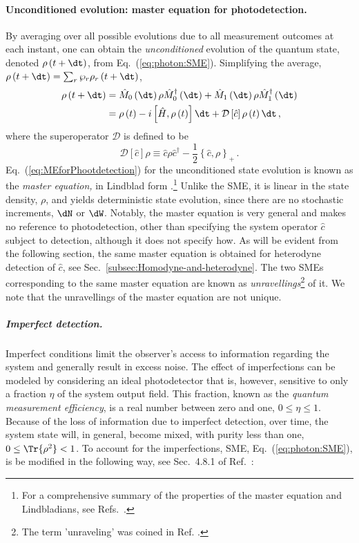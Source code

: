 \paragraph{Unconditioned evolution: master equation for photodetection. }

By averaging over all possible evolutions due to all measurement outcomes
at each instant, one can obtain the \emph{unconditioned} evolution
of the quantum state, denoted $\rho\left(t+\dt\right)$, from Eq.~(\ref{eq:photon:SME}).
Simplifying the average, $\rho\left(t+\dt\right)=\sum_{r}\wp_{r}\rho_{r}\left(t+\dt\right)$,
\begin{align}
\rho\left(t+\dt\right) & =\hat{M}_{0}\left(\dt\right)\rho\hat{M}_{0}^{\dagger}\left(\dt\right)+\hat{M}_{1}\left(\dt\right)\rho\hat{M}_{1}^{\dagger}\left(\dt\right)\\
 & =\rho\left(t\right)-i\left[\hat{H},\rho\left(t\right)\right]\dt+\mathcal{D}\left[\hat{c}\right]\rho\left(t\right)\dt\,,\label{eq:MEforPhootdetection}
\end{align}
where the superoperator $\mathcal{D}$ is defined to be 
\begin{equation}
\mathcal{D}\left[\hat{c}\right]\rho\equiv\hat{c}\rho\hat{c}^{\dagger}-\frac{1}{2}\left\{ \hat{c},\rho\right\} _{+}\,.\label{eq:LindbladSuperop}
\end{equation}
Eq.~(\ref{eq:MEforPhootdetection}) for the unconditioned state evolution
is known as the \emph{master equation, }in Lindblad\emph{ }form \citep{lindblad1976}.\footnote{For a comprehensive summary of the properties of the master equation
and Lindbladians, see Refs.~\citet{AlbertVV2014-Lindblad,Albert2016-Lindblad}.} Unlike the SME, it is linear in the state density, $\rho$, and yields
deterministic state evolution, since there are no stochastic increments,
$\dN$ or $\dW$. Notably, the master equation is very general and
makes no reference to photodetection, other than specifying the system
operator $\hat{c}$ subject to detection, although it does not specify
how. As will be evident from the following section, the same master
equation is obtained for heterodyne detection of $\hat{c}$, see Sec.~\ref{subsec:Homodyne-and-heterodyne}.
The two SMEs corresponding to the same master equation are known as
\emph{unravellings}\footnote{The\emph{ }term 'unraveling' was coined in Ref. \citet{Carmichael1993}.}\emph{
}of it. We note that the unravellings of the master equation are not
unique.

\subparagraph{Imperfect detection.}

Imperfect conditions limit the observer's access to information regarding
the system and generally result in excess noise. The effect of imperfections
can be modeled by considering an ideal photodetector that is, however,
sensitive to only a fraction $\eta$ of the system output field. This
fraction, known as the \emph{quantum measurement efficiency}, is a
real number between zero and one, $0\leq\eta\leq1$. Because of the
loss of information due to imperfect detection, over time, the system
state will, in general, become mixed, with purity less than one, $0\leq\Tr{\rho^{2}}<1$.
To account for the imperfections, SME, Eq.~(\ref{eq:photon:SME}),
is be modified in the following way, see Sec.~4.8.1 of Ref.~\citet{wiseman2010book}:

